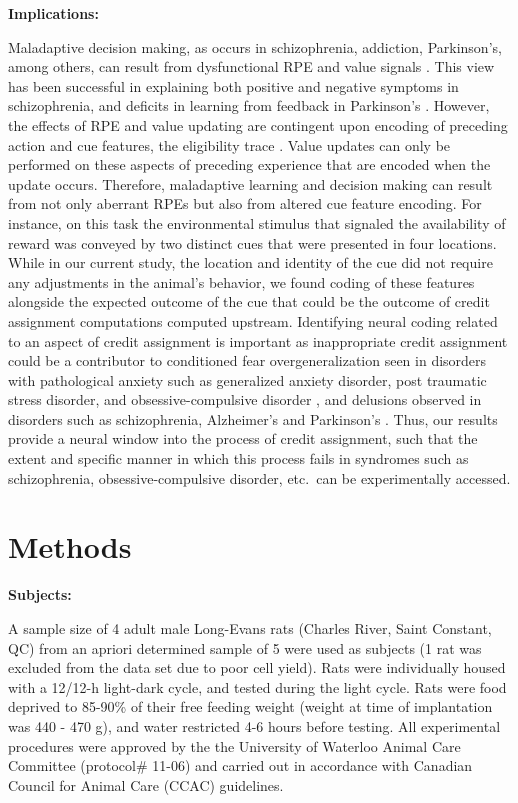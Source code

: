 \documentclass[11pt]{article}
\let\cite=\citep
\begin{document}
{\bf Implications:}

Maladaptive decision making, as occurs in schizophrenia, addiction,
Parkinson's, among others, can result from dysfunctional RPE and value
signals \cite{Frank2004,Gradin2011,Maia2011}. This view has been
successful in explaining both positive and negative symptoms in
schizophrenia, and deficits in learning from feedback in Parkinson's
\cite{Frank2004,Gradin2011}. However, the effects of RPE and value
updating are contingent upon encoding of preceding action and cue
features, the eligibility trace \cite{sutton1998,Lee2012}. Value
updates can only be performed on these aspects of preceding experience
that are encoded when the update occurs. Therefore, maladaptive
learning and decision making can result from not only aberrant RPEs
but also from altered cue feature encoding. For instance, on this task
the environmental stimulus that signaled the availability of reward
was conveyed by two distinct cues that were presented in four
locations. While in our current study, the location and identity of
the cue did not require any adjustments in the animal’s behavior, we
found coding of these features alongside the expected outcome of the
cue that could be the outcome of credit assignment computations
computed upstream. Identifying neural coding related to an aspect of
credit assignment is important as inappropriate credit assignment
could be a contributor to conditioned fear overgeneralization seen in
disorders with pathological anxiety such as generalized anxiety
disorder, post traumatic stress disorder, and obsessive-compulsive
disorder \cite{Kaczkurkin2013,Lissek2014,Kaczkurkin2017}, and
delusions observed in disorders such as schizophrenia, Alzheimer's and
Parkinson's \cite{Kapur2003,Corlett2010}. Thus, our results provide a
neural window into the process of credit assignment, such that the
extent and specific manner in which this process fails in syndromes such as schizophrenia, obsessive-compulsive disorder,
etc.\ can be experimentally accessed.

\section*{Methods}

{\bf Subjects:}

A sample size of 4 adult male Long-Evans rats (Charles River, Saint Constant, QC) from an apriori determined sample of 5 
were used as subjects (1 rat was excluded from the data set due to poor cell yield). Rats were individually housed with a 12/12-h
light-dark cycle, and tested during the light cycle. Rats were food
deprived to 85-90\% of their free feeding weight (weight at time of
implantation was 440 - 470 g), and water restricted 4-6 hours before
testing. All experimental procedures were approved by the the
University of Waterloo Animal Care Committee (protocol\# 11-06) and
carried out in accordance with Canadian Council for Animal Care (CCAC)
guidelines.
\end{document}
